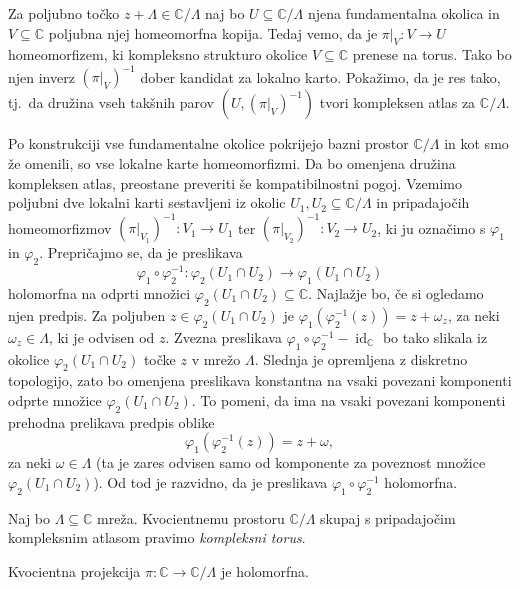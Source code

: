 \documentclass[mat1]{fmfdelo}
\numberwithin{equation}{section}
\newcommand{\C}{\mathbb C}
\newcommand{\om}{\omega}
\newcommand{\inv}{^{-1}}
\newcommand{\torus}{\C/\Lambda}
\newcommand{\tj}{tj.\ }
\DeclareMathOperator{\id}{id}
\theoremstyle{definition}
\begin{document}
\begin{dokaz}
    Za poljubno točko $z + \Lambda \in \torus$ naj bo $U \subseteq \torus$ njena fundamentalna okolica in $V \subseteq \C$ poljubna njej homeomorfna kopija. Tedaj vemo, da je $\pi|_V : V \to U$ homeomorfizem, ki kompleksno strukturo okolice $V \subseteq \C$ prenese na torus. Tako bo njen inverz $(\pi|_V)\inv$ dober kandidat za lokalno karto. Pokažimo, da je res tako, \tj da družina vseh takšnih parov $(U, (\pi|_V)\inv)$ tvori kompleksen atlas za $\torus$. 

    Po konstrukciji vse fundamentalne okolice pokrijejo bazni prostor $\torus$ in kot smo že omenili, so vse lokalne karte homeomorfizmi. Da bo omenjena družina kompleksen atlas, preostane preveriti še kompatibilnostni pogoj. Vzemimo poljubni dve lokalni karti sestavljeni iz okolic $U_1, U_2 \subseteq \torus$ in pripadajočih homeomorfizmov $(\pi|_{V_1})\inv : V_1 \to U_1$ ter $(\pi|_{V_2})\inv : V_2 \to U_2$, ki ju označimo s $\varphi_1$ in $\varphi_2$. Prepričajmo se, da je preslikava 
    \[
        \varphi_1 \circ \varphi_2\inv : \varphi_2(U_1 \cap U_2) \longrightarrow  \varphi_1(U_1 \cap U_2)
    \]
    holomorfna na odprti množici $\varphi_2(U_1 \cap U_2) \subseteq \C$. Najlažje bo, če si ogledamo njen predpis. Za poljuben $z \in \varphi_2(U_1 \cap U_2)$ je $\varphi_1(\varphi_2\inv(z)) = z + \om_z$, za neki $\om_z \in \Lambda$, ki je odvisen od $z$. Zvezna preslikava $\varphi_1 \circ \varphi_2\inv - \id_\C$ bo tako slikala iz okolice $\varphi_2(U_1 \cap U_2)$ točke $z$ v mrežo $\Lambda$. Slednja je opremljena z diskretno topologijo, zato bo omenjena preslikava konstantna na vsaki povezani komponenti odprte množice $\varphi_2(U_1 \cap U_2)$. To pomeni, da ima na vsaki povezani komponenti prehodna prelikava predpis oblike 
    \[
        \varphi_1(\varphi_2\inv(z)) = z + \om,
    \]
    za neki $\om \in \Lambda$ (ta je zares odvisen samo od komponente za poveznost množice $\varphi_2(U_1 \cap U_2)$). Od tod je razvidno, da je preslikava $\varphi_1 \circ \varphi_2\inv$ holomorfna. 
\end{dokaz}

\begin{definicija}
    Naj bo $\Lambda \subseteq \C$ mreža. Kvocientnemu prostoru $\torus$ skupaj s pripadajočim kompleksnim atlasom pravimo \emph{kompleksni torus}.  
\end{definicija}

\begin{lema}
    \label{holomorfnost projekcije}
    Kvocientna projekcija $\pi : \C \to \torus$ je holomorfna. 
\end{lema}
\end{document}
